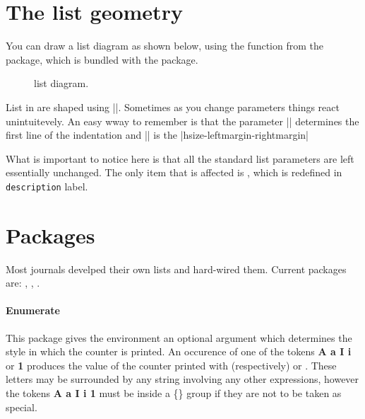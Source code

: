 \section{The list geometry}

You can draw a list diagram as shown below, using the function  from
the  package, which is bundled with the  package.


\begin{figure}[htbp]
\bgroup
\centering
{}
\drawlistdiagram
\caption[List geoemetry]{\latexe list diagram.}
\egroup
\end{figure}


List in \latexe are shaped using |\parshape|. Sometimes as you change parameters things react unintuitevely. An easy wway to remember is that the parameter |\leftmargin| determines the first line of the indentation and |\linewidth| is the
|hsize-leftmargin-rightmargin|



What is important to notice here is that all the standard list parameters are left essentially unchanged. The only item that is affected is , which is redefined in \lstinline{description} label.

\section{Packages}


 Most journals develped their own lists and hard-wired them. Current packages are:
 , , .



\paragraph{Enumerate} This package gives the  environment an optional argument which determines
 the style in which the counter is printed. An occurence of one of the tokens 
 \textbf{A a I i } or \textbf{1} produces the value of the counter printed with
 (respectively) \cmd{\Alph} \cmd{\alph} \cmd{\Roman} \cmd{\roman} or \cmd{\arabic}. 
 These letters may be surrounded by any string involving any other \tex expressions, 
 however the tokens \textbf{A a I i 1} must be inside a \{\} group if they are
 not to be taken as special.

